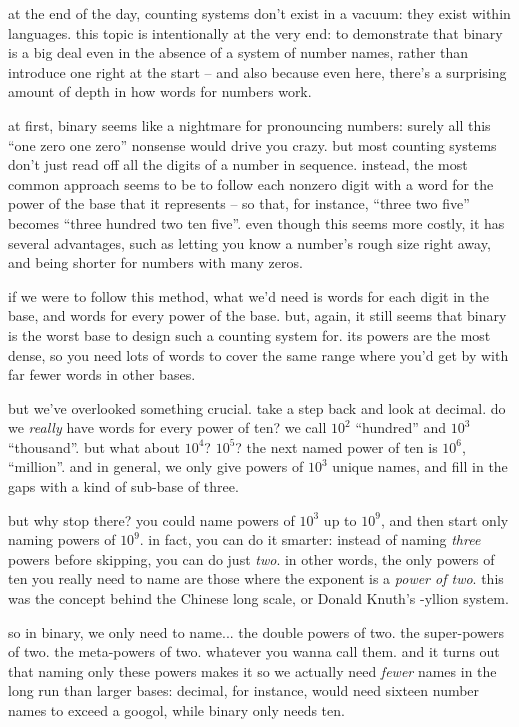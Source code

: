 \documentclass[../best.tex]{subfiles}
\begin{document}

at the end of the day, counting systems don't exist in a vacuum: they exist within languages. this topic is intentionally at the very end: to demonstrate that binary is a big deal even in the absence of a system of number names, rather than introduce one right at the start -- and also because even here, there's a surprising amount of depth in how words for numbers work.

at first, binary seems like a nightmare for pronouncing numbers: surely all this ``one zero one zero'' nonsense would drive you crazy. but most counting systems don't just read off all the digits of a number in sequence. instead, the most common approach seems to be to follow each nonzero digit with a word for the power of the base that it represents -- so that, for instance, ``three two five'' becomes ``three hundred two ten five''. even though this seems more costly, it has several advantages, such as letting you know a number's rough size right away, and being shorter for numbers with many zeros.\myfootnote{}

if we were to follow this method, what we'd need is words for each digit in the base, and words for every power of the base. but, again, it still seems that binary is the worst base to design such a counting system for. its powers are the most dense, so you need lots of words to cover the same range where you'd get by with far fewer words in other bases.

but we've overlooked something crucial. take a step back and look at decimal. do we \emph{really} have words for every power of ten? we call $10^2$ ``hundred'' and $10^3$ ``thousand''. but what about $10^4$? $10^5$? the next named power of ten is $10^6$, ``million''. and in general, we only give powers of $10^3$ unique names, and fill in the gaps with a kind of sub-base of three.\myfootnote{}

but why stop there? you could name powers of $10^3$ up to $10^9$, and then start only naming powers of $10^9$. in fact, you can do it smarter: instead of naming \emph{three} powers before skipping, you can do just \emph{two}. in other words, the only powers of ten you really need to name are those where the exponent is a \emph{power of two}. this was the concept behind the Chinese long scale,\myfootnote{} or Donald Knuth's -yllion system.\myfootnote{}

so in binary, we only need to name... the double powers of two. the super-powers of two. the meta-powers of two. whatever you wanna call them. and it turns out that naming only these powers makes it so we actually need \emph{fewer} names in the long run than larger bases: decimal, for instance, would need sixteen number names to exceed a googol, while binary only needs ten.
\end{document}
